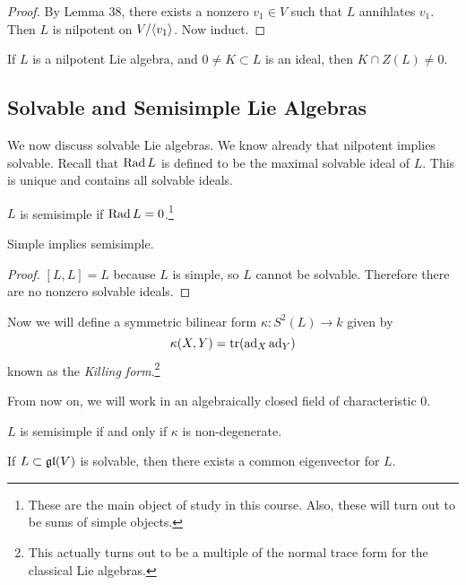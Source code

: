 \documentclass[twoside, 10pt]{article}
\begin{document}
    \begin{proof}
        By Lemma 38, there exists a nonzero $v_1 \in V$ such that $L$ annihlates $v_1$. Then $L$ is nilpotent on $V / \langle v_1\rangle$. Now induct.
    \end{proof}

    \begin{cor}
        If $L$ is a nilpotent Lie algebra, and $0 \neq K \subset L$ is an ideal, then $K \cap Z(L) \neq 0$.
    \end{cor}

    \subsection{Solvable and Semisimple Lie Algebras}%
    \label{sub:solvable_and_semisimple_lie_algebras}
    
    
    We now discuss solvable Lie algebras. We know already that nilpotent implies solvable. Recall that $\operatorname{Rad} L$ is defined to be the maximal solvable ideal of $L$. This is unique and contains all solvable ideals.

    \begin{defn}
        $L$ is semisimple if $\operatorname{Rad} L = 0$.\footnote{These are the main object of study in this course. Also, these will turn out to be sums of simple objects.}
    \end{defn}

    \begin{prop}
        Simple implies semisimple.
    \end{prop}

    \begin{proof}
        $[L,L] = L$ because $L$ is simple, so $L$ cannot be solvable. Therefore there are no nonzero solvable ideals.
    \end{proof}
    
    Now we will define a symmetric bilinear form
    $\kappa: S^2(L) \to k$ given by \[\kappa(X,Y) = \operatorname{tr}(\operatorname{ad}_X \operatorname{ad}_Y)\] known as the \textit{Killing form}.\footnote{This actually turns out to be a multiple of the normal trace form for the classical Lie algebras.}

    From now on, we will work in an algebraically closed field of characteristic $0$.
    \begin{thm}[Killing]
        $L$ is semisimple if and only if $\kappa$ is non-degenerate.
    \end{thm}

    \begin{thm}[Lie]
        If $L \subset \mathfrak{gl}(V)$ is solvable, then there exists a common eigenvector for $L$.
    \end{thm}
    
\end{document}
